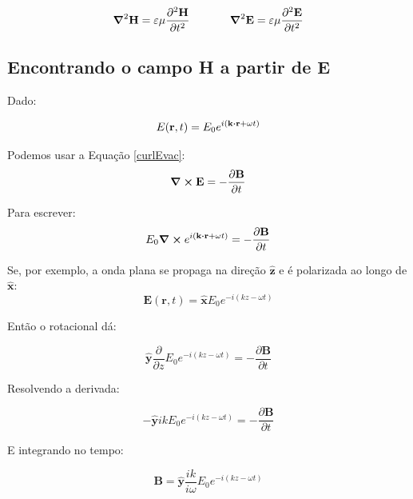 \documentclass[12pt,a4paper]{report}
\begin{document}
\begin{equation}
    \grad^2{\textbf{H}}=\varepsilon\mu\frac{\partial^2\textbf{H}}{\partial t^2}\;\;\;\;\;\;\;\;\;\;\;\;\;\grad^2{\textbf{E}}=\varepsilon\mu\frac{\partial^2\textbf{E}}{\partial t^2}
\end{equation}

\subsection{Encontrando o campo \textbf{H} a partir de \textbf{E}}\label{encontrando.campo.h}

Dado:

\begin{equation}
    E(\textbf{r},t)=E_0e^{i(\textbf{k}\vdot\textbf{r}+\omega t)}
\end{equation}

Podemos usar a Equação \ref{curlEvac}:
\begin{equation}
    \curl{\textbf{E}}=-\frac{\partial\textbf{B}}{\partial t}
\end{equation}

Para escrever:
\begin{equation}
    E_0\curl{e^{i(\textbf{k}\vdot\textbf{r}+\omega t)}}=-\frac{\partial\textbf{B}}{\partial t}
\end{equation}

Se, por exemplo, a onda plana se propaga na direção $\hat{\textbf{z}}$ e é polarizada ao longo de $\hat{\textbf{x}}$:
\begin{equation}
    \textbf{E}(\textbf{r},t)=\hat{\textbf{x}}E_0e^{-i(kz-\omega t)}
\end{equation}

Então o rotacional dá:

\begin{equation}
    \hat{\textbf{y}}\frac{\partial}{\partial z}E_0e^{-i(kz-\omega t)}=-\frac{\partial\textbf{B}}{\partial t}
\end{equation}

Resolvendo a derivada:

\begin{equation}
    -\hat{\textbf{y}}ikE_0e^{-i(kz-\omega t)}=-\frac{\partial\textbf{B}}{\partial t}
\end{equation}

E integrando no tempo:

\begin{equation}
    \textbf{B}=\hat{\textbf{y}}\frac{ik}{i\omega}E_0e^{-i(kz-\omega t)}
\end{equation}
\end{document}
